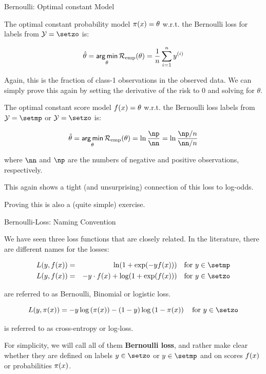 \begin{vbframe}{Bernoulli: Optimal constant Model}

The optimal constant probability model $\pi(x) = \theta$ w.r.t. the Bernoulli loss for labels from $\Yspace = \setzo$ is:

\begin{eqnarray*}
  \hat{\theta} = \mathop{\sf arg\,min}_{\theta} \mathcal{R}_{\text{emp}}(\theta) = \frac{1}{n} \sum_{i=1}^n y^{(i)}
\end{eqnarray*}

Again, this is the fraction of class-1 observations in the observed data.
We can simply prove this again by setting the derivative of the risk to 0 and solving for $\theta$.

\framebreak

The optimal constant score model $f(x) = \theta$ w.r.t. the Bernoulli loss labels from $\Yspace = \setmp$ or $\Yspace = \setzo$ is:

\begin{eqnarray*}
  \thetah = \argmin_{\theta} \risket = \ln \frac{\np}{\nn} = \ln \frac{\np / n}{\nn /n} 
\end{eqnarray*}

where $\nn$ and $\np$ are the numbers of negative and positive observations, respectively.

\lz

This again shows a tight (and unsurprising) connection of this loss to log-odds.

\lz

Proving this is also a (quite simple) exercise.

\end{vbframe}

\begin{vbframe}{Bernoulli-Loss: Naming Convention}

We have seen three loss functions that are closely related. In the literature, there are different names for the losses: 

\begin{eqnarray*}
  L(y, \fx) &=& \ln(1+\exp(-y\fx)) \quad \text{for } y \in \setmp \\
  L(y, \fx) &=& - y \cdot \fx + \log(1 + \exp(\fx)) \quad \text{for } y \in \setzo 
\end{eqnarray*}

are referred to as Bernoulli, Binomial or logistic loss. 

  $$
    L(y, \pix) = - y \log \left(\pix\right) - (1 - y) \log \left(1 - \pix\right) \quad \text{for } y \in \setzo
  $$

is referred to as cross-entropy or log-loss. 

\lz 

For simplicity, we will call all of them \textbf{Bernoulli loss}, and rather make clear whether they are defined on labels $y \in \setzo$ or $y \in \setmp$ and on scores $f(x)$ or probabilities $\pi(x)$. 

\end{vbframe}



